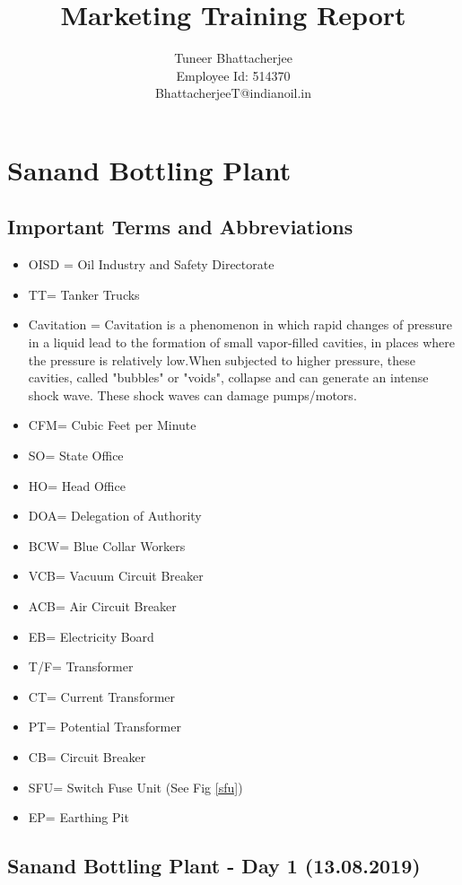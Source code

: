 \documentclass{report}
\title{Marketing Training Report}
\author{Tuneer Bhattacherjee\\Employee Id: 514370\\BhattacherjeeT@indianoil.in}
\begin{document}
	\maketitle
	\pagebreak
	\tableofcontents
	\pagebreak
	\chapter{Sanand Bottling Plant}
	\section{Important Terms and Abbreviations}
	\begin{itemize}
		\item OISD = Oil Industry and Safety Directorate
		\item TT= Tanker Trucks
		\item Cavitation = Cavitation is a phenomenon in which rapid changes of pressure in a liquid lead to the formation of small vapor-filled cavities, in places where the pressure is relatively low.When subjected to higher pressure, these cavities, called "bubbles" or "voids", collapse and can generate an intense shock wave. These shock waves can damage pumps/motors.
		\item CFM= Cubic Feet per Minute
		\item SO= State Office
		\item HO= Head Office
		\item DOA= Delegation of Authority
		\item BCW= Blue Collar Workers
		\item VCB= Vacuum Circuit Breaker
		\item ACB= Air Circuit Breaker
		\item EB= Electricity Board
		\item T/F= Transformer
		\item CT= Current Transformer
		\item PT= Potential Transformer
		\item CB= Circuit Breaker
		\item SFU= Switch Fuse Unit (See Fig \ref{sfu})
		\item EP= Earthing Pit
	\end{itemize}
	\section{Sanand Bottling Plant - Day 1 (13.08.2019)}
	
\end{document}
